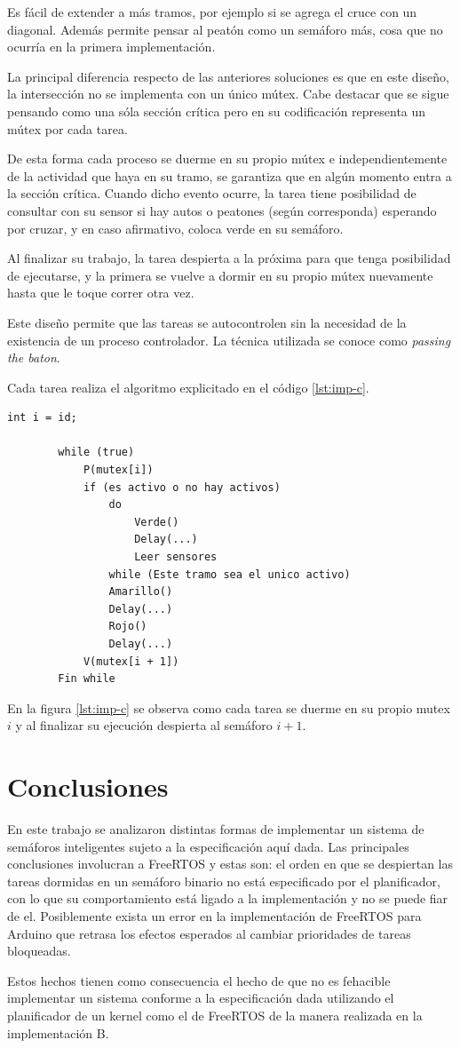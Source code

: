 	Es fácil de extender a más tramos, por ejemplo si se agrega el cruce con un diagonal.
	Además permite pensar al peatón como un semáforo más, cosa que no ocurría en la primera implementación.

	La principal diferencia respecto de las anteriores soluciones es que en este diseño, la intersección no se implementa con un único mútex.
	Cabe destacar que se sigue pensando como una sóla sección crítica pero en su codificación representa un mútex por cada tarea.

	De esta forma cada proceso se duerme en su propio mútex e independientemente de la actividad que haya en su tramo, se garantiza que en algún momento entra a la sección crítica.
	Cuando dicho evento ocurre, la tarea tiene posibilidad de consultar con su sensor si hay autos o peatones (según corresponda) esperando por cruzar, y en caso afirmativo, coloca verde en su semáforo.

	Al finalizar su trabajo, la tarea despierta a la próxima para que tenga posibilidad de ejecutarse, y la primera se vuelve a dormir en su propio mútex nuevamente hasta que le toque correr otra vez.

	Este diseño permite que las tareas se autocontrolen sin la necesidad de la existencia de un proceso controlador.
	La técnica utilizada se conoce como \emph{passing the baton}.

	Cada tarea realiza el algoritmo explicitado en el código \ref{lst:imp-c}.

	\begin{lstlisting}[float, label=lst:imp-c, caption=Pseudocódigo del programa que corre cada tarea en la implementación C.]
		int i = id;

		while (true)
			P(mutex[i])
			if (es activo o no hay activos)
				do
					Verde()
					Delay(...)
					Leer sensores
				while (Este tramo sea el unico activo)
				Amarillo()
				Delay(...)
				Rojo()
				Delay(...)
			V(mutex[i + 1])
		Fin while
	\end{lstlisting}

	En la figura \ref{lst:imp-c} se observa como cada tarea se duerme en su propio mutex $i$ y al finalizar su ejecución despierta al semáforo $i+1$.



\section{Conclusiones}\label{sec:conclusiones}
	En este trabajo se analizaron distintas formas de implementar un sistema de semáforos inteligentes sujeto a la especificación aquí dada. Las principales conclusiones involucran a FreeRTOS y estas son: el orden en que se despiertan las tareas dormidas en un semáforo binario no está especificado por el planificador, con lo que su comportamiento está ligado a la implementación y no se puede fiar de el. Posiblemente exista un error en la implementación de FreeRTOS para Arduino que retrasa los efectos esperados al cambiar prioridades de tareas bloqueadas.

	Estos hechos tienen como consecuencia el hecho de que no es fehacible implementar un sistema conforme a la especificación dada utilizando el planificador de un kernel como el de FreeRTOS de la manera realizada en la implementación B.

